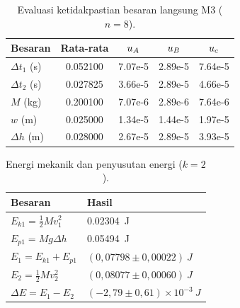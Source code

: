 \documentclass[a4paper, 12pt]{article}
\begin{document}
\begin{table}[H]
\centering
\singlespacing
\caption{Evaluasi ketidakpastian besaran langsung M3 ($n=8$).}
\label{tab:uM3}
\small
\begin{tabular}{l S[table-format=1.6] S[table-format=1.2e-1] S[table-format=1.2e-1] S[table-format=1.2e-1]}
\toprule
\textbf{Besaran} & {Rata-rata} & {$u_{A}$} & {$u_{B}$} & {$u_{c}$}\\
\midrule
$\Delta t_1$ (s) & 0.052100 & 7.07e-5 & 2.89e-5 & 7.64e-5\\
$\Delta t_2$ (s) & 0.027825 & 3.66e-5 & 2.89e-5 & 4.66e-5\\
$M$ (kg) & 0.200100 & 7.07e-6 & 2.89e-6 & 7.64e-6\\
$w$ (m) & 0.025000 & 1.34e-5 & 1.44e-5 & 1.97e-5\\
$\Delta h$ (m) & 0.028000 & 2.67e-5 & 2.89e-5 & 3.93e-5\\
\bottomrule
\end{tabular}
\end{table}

\begin{table}[H]
\centering
\singlespacing
\caption{Energi mekanik dan penyusutan energi ($k=2$).}
\label{tab:E}
\small
\begin{tabular}{l l}
\toprule
\textbf{Besaran} & \textbf{Hasil}\\
\midrule
$E_{k1}=\tfrac{1}{2}Mv_1^2$ & \SI{0,02304}{J}\\
$E_{p1}=Mg\Delta h$ & \SI{0,05494}{J}\\
$E_1=E_{k1}+E_{p1}$ & $(0{,}07798\pm0{,}00022)\ \si{J}$\\
$E_2=\tfrac{1}{2}Mv_2^2$ & $(0{,}08077\pm0{,}00060)\ \si{J}$\\
$\Delta E=E_1-E_2$ & $(-2{,}79\pm0{,}61)\times10^{-3}\ \si{J}$\\
\bottomrule
\end{tabular}
\end{table}
\end{document}
